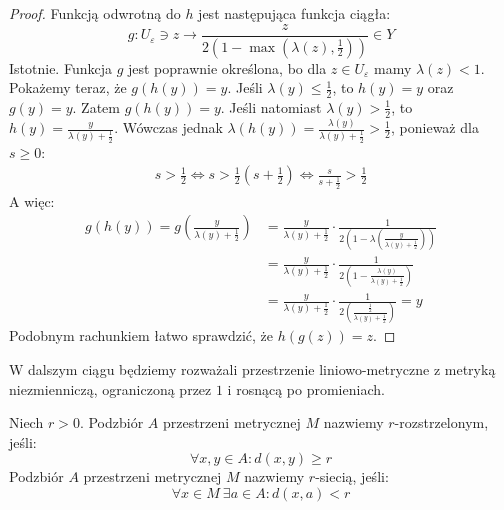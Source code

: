 \begin{lem}
\begin{proof}
    Funkcją odwrotną do $h$ jest następująca funkcja ciągła:
    \[
      g: U_\varepsilon \ni z \to \frac{z}{2(1-\max(\lambda(z), \frac{1}{2}))} \in Y
    \]
    Istotnie. Funkcja $g$ jest poprawnie określona, bo dla $z\in U_\varepsilon$ mamy $\lambda(z) < 1$. Pokażemy teraz, że $g(h(y)) = y$. Jeśli $\lambda(y) \leq \frac{1}{2}$, to $h(y) = y$ oraz $g(y) = y$. Zatem $g(h(y)) = y$. Jeśli natomiast $\lambda(y) > \frac{1}{2}$, to $h(y) = \frac{y}{\lambda(y)+\frac{1}{2}}$. Wówczas jednak $\lambda(h(y)) = \frac{\lambda(y)}{\lambda(y)+\frac{1}{2}} > \frac{1}{2}$, ponieważ dla $s \geq 0$:
    \begin{align*}
      s > \frac{1}{2} \iff s > \frac{1}{2}\left(s + \frac{1}{2}\right) \iff \frac{s}{s+\frac{1}{2}} > \frac{1}{2}
    \end{align*}
    A więc:
    \begin{align*}
      g(h(y)) = g\left(\frac{y}{\lambda(y)+\frac{1}{2}}\right) &= \frac{y}{\lambda(y)+\frac{1}{2}} \cdot \frac{1}{2\left(1-\lambda\left(\frac{y}{\lambda(y)+\frac{1}{2}}\right)\right)} \\
      &= \frac{y}{\lambda(y)+\frac{1}{2}} \cdot \frac{1}{2\left(1-\frac{\lambda(y)}{\lambda(y)+\frac{1}{2}}\right)} \\
      &= \frac{y}{\lambda(y)+\frac{1}{2}} \cdot \frac{1}{2\left(\frac{\frac{1}{2}}{\lambda(y)+\frac{1}{2}}\right)} = y
    \end{align*}
    Podobnym rachunkiem łatwo sprawdzić, że $h(g(z)) = z$.
  \end{proof}
\end{lem}

W dalszym ciągu będziemy rozważali przestrzenie liniowo-metryczne z metryką niezmienniczą, ograniczoną przez $1$ i rosnącą po promieniach.

\begin{df}
  Niech $r > 0$. Podzbiór $A$ przestrzeni metrycznej $M$ nazwiemy $r$-rozstrzelonym, jeśli:
  \[
    \forall x, y \in A: d(x,y) \geq r
  \]
  Podzbiór $A$ przestrzeni metrycznej $M$ nazwiemy $r$-siecią, jeśli:
  \[
    \forall x \in M\ \exists a \in A: d(x,a) < r
  \]
\end{df}

